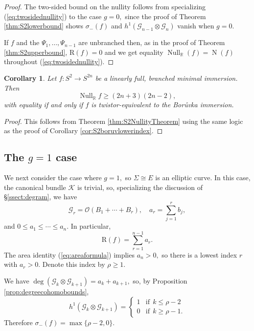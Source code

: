 \documentclass[11pt]{article}
\newtheorem{cor}[theorem]{Corollary}
\theoremstyle{definition}
\newcommand{\R}{\mathbb{R}}
\numberwithin{equation}{section}
\begin{document}
\begin{proof}
    The two-sided bound on the nullity follows from specializing (\ref{eq:twosidednullity}) to the case $g=0,$ since the proof of Theorem \ref{thm:S2lowerbound} shows $\sigma_-(f)$ and $h^1(\mathcal{G}_{n-1} \otimes \mathcal{G}_n)$ vanish when $g=0.$

     If $f$ and the $\Psi_1, \ldots, \Psi_{n-1}$ are unbranched then, as in the proof of Theorem \ref{thm:S2upperbound}, $\mathrm{R}(f) = 0$ and we get equality $\operatorname{Null}_\R(f) = \operatorname{N}(f)$ throughout (\ref{eq:twosidednullity}).
\end{proof}

\begin{cor}
    Let $f: S^2 \to S^{2n}$ be a linearly full, branched minimal immersion. Then
	\begin{equation}\label{eq:niceS2nulllower}
		\operatorname{Null}_\R f \geq (2n+3)(2n-2),
	\end{equation}
	with equality if and only if $f$ is twistor-equivalent to the Bor\r{u}vka immersion.
\end{cor}

\begin{proof}
    This follows from Theorem \ref{thm:S2NullityTheorem} using the same logic as the proof of Corollary \ref{cor:S2boruvlowerindex}.
\end{proof}

\subsection{The $g=1$ case}\label{ssect:genusone}

\indent \indent We next consider the case where $g=1,$ so $\Sigma \cong E$ is an elliptic curve. In this case, the canonical bundle $\mathcal{K}$ is trivial, so, specializing the discussion of \S\ref{ssect:degram}, we have
\begin{equation*}
    \mathcal{G}_r = \mathcal{O}(B_1 + \cdots + B_r), \quad a_r = \sum_{j=1}^r b_j,
\end{equation*}
and $0 \leq a_1 \leq \cdots \leq a_n$. In particular, 
\begin{equation*}
    \mathrm{R}(f) = \sum_{r=1}^{n-1} a_r.
\end{equation*}
The area identity (\ref{eq:areaformula}) implies $a_n > 0,$ so there is a lowest index $r$ with $a_r > 0.$ Denote this index by $\rho \geq 1.$

We have $\deg(\mathcal{G}_k \otimes \mathcal{G}_{k+1}) = a_k + a_{k+1},$ so, by Proposition \ref{prop:degreecohomobounds},
\begin{equation*}
    h^1(\mathcal{G}_k \otimes \mathcal{G}_{k+1}) = \begin{cases}
        1 & \text{if} \:\: k \leq \rho-2 \\
        0 & \text{if} \:\: k \geq \rho-1.
    \end{cases}
\end{equation*}
Therefore $\sigma_-(f) = \max \lbrace \rho-2, 0 \rbrace.$
\end{document}
